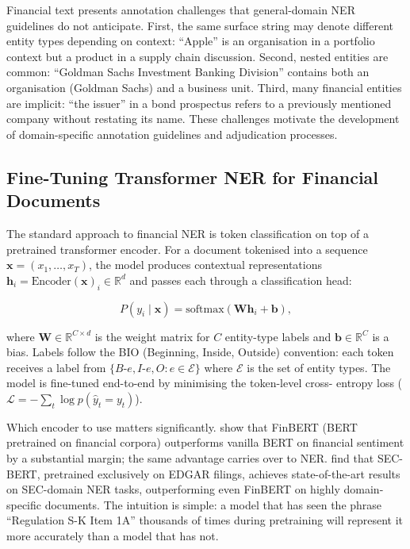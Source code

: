 \begin{remark}
\label{rem:annotation-challenges}
Financial text presents annotation challenges that general-domain NER guidelines do not
anticipate. First, the same surface string may denote different entity types depending on
context: ``Apple'' is an organisation in a portfolio context but a product in a supply
chain discussion. Second, nested entities are common: ``Goldman Sachs Investment Banking
Division'' contains both an organisation (Goldman Sachs) and a business unit. Third, many
financial entities are implicit: ``the issuer'' in a bond prospectus refers to a
previously mentioned company without restating its name. These challenges motivate the
development of domain-specific annotation guidelines and adjudication processes.
\end{remark}

\subsection{Fine-Tuning Transformer NER for Financial Documents}
\label{sec:ch14-finetuning-transformer-ner}

The standard approach to financial NER is token classification on top of a pretrained
transformer encoder. For a document tokenised into a sequence
$\mathbf{x} = (x_1, \ldots, x_T)$, the model produces contextual representations
$\mathbf{h}_i = \text{Encoder}(\mathbf{x})_i \in \mathbb{R}^d$ and passes each through
a classification head:

\begin{equation}
\label{eq:ner-classification}
P(y_i \mid \mathbf{x}) = \text{softmax}(\mathbf{W} \mathbf{h}_i + \mathbf{b}),
\end{equation}

where $\mathbf{W} \in \mathbb{R}^{C \times d}$ is the weight matrix for $C$ entity-type
labels and $\mathbf{b} \in \mathbb{R}^C$ is a bias. Labels follow the BIO (Beginning,
Inside, Outside) convention: each token receives a label from
$\{B\text{-}e, I\text{-}e, O : e \in \mathcal{E}\}$ where $\mathcal{E}$ is the set of
entity types. The model is fine-tuned end-to-end by minimising the token-level cross-
entropy loss ($\mathcal{L} = -\sum_t \log p(\hat{y}_t = y_t)$).

Which encoder to use matters significantly. \citet{yang2020finbert} show that FinBERT
(BERT pretrained on financial corpora) outperforms vanilla BERT on financial sentiment
by a substantial margin; the same advantage carries over to NER. \citet{loukas2022secbert}
find that SEC-BERT, pretrained exclusively on EDGAR filings, achieves state-of-the-art
results on SEC-domain NER tasks, outperforming even FinBERT on highly domain-specific
documents. The intuition is simple: a model that has seen the phrase ``Regulation S-K
Item 1A'' thousands of times during pretraining will represent it more accurately than
a model that has not.

